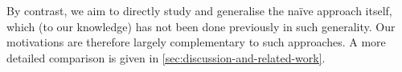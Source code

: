 By contrast, we aim to directly study and generalise the naïve approach itself, which (to our knowledge) has not been done previously in such generality.
%
Our motivations are therefore largely complementary to such approaches.
%
A more detailed comparison is given in \cref{sec:discussion-and-related-work}.



